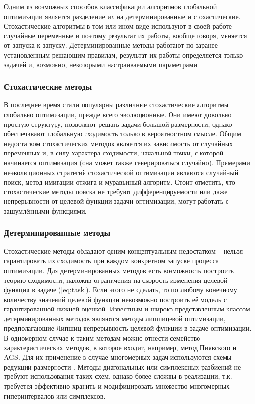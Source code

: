 Одним из возможных способов классификации алгоритмов глобальной оптимизации является разделение их
на детерминированные и стохастические. Стохастические алгоритмы в том или ином виде используют в своей работе
случайные переменные и поэтому результат их работы, вообще говоря, меняется от запуска к запуску. Детерминированные методы
работают по заранее установленным решающим правилам, результат их работы определяется только задачей и,
возможно, некоторыми настраиваемыми параметрами.

\subsubsection{Стохастические методы}

В последнее время стали популярны различные стохастические алгоритмы глобально оптимизации,
прежде всего эволюционные.
Они имеют довольно простую структуру, позволяют решать задачи большой размерности,
однако обеспечивают глобальную сходимость только в вероятностном смысле. Общим недостатком
стохастических методов является их зависимость от случайных переменных и, в силу характера сходимости,
начальной точки, с которой начинается оптимизация (она может также генерироваться случайно).
Примерами неэволюционных стратегий стохастической оптимизации являются случайный поиск,
метод имитации отжига и муравьиный алгоритм. Стоит отметить, что
стохастические методы поиска не требуют дифференцируемости или даже непрерывности от целевой функции задачи оптимизации,
могут работать с зашумлёнными функциями.

\subsubsection{Детерминированные методы}

Стохастические методы обладают одним концептуальным недостатком -- нельзя гарантировать их сходимость при
каждом конкретном запуске процесса оптимизации. Для детерминированных методов есть возможность построить теорию сходимости,
наложив ограничения на скорость изменения целевой функции в задаче (\ref{eq:task}). Если этого не сделать, то
по любому конечному количеству значений целевой функции невозможно построить её модель с гарантированной нижней оценкой.
Известным и широко представленным классом детерминированных методов являются методы липшицевой оптимизации, предполагающие
Липшиц-непрерывность целевой функции в задаче оптимизации. В одномерном случае к таким методам можно отнести семейство
характеристических методов, в которое входит, например, метод Пиявского и AGS.
Для их применение в случае многомерных задач используются схемы редукции размерности \cite{strongin1978}.
Методы диагональных или симплексных разбиений не требуют использования
таких схем, однако более сложны в реализации, т.к. требуется эффективно хранить и модифицировать множество многомерных гиперинтервалов
или симплексов.

